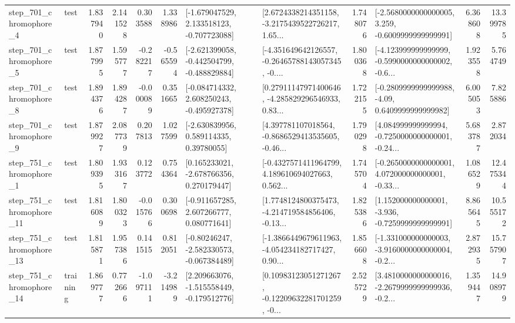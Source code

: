 \begin{tabular}{llrrrrllrlrr}
   step\_701\_chromophore\_4 &      test &      1.837940 &    2.141528 &      0.303588 &  1.338986 &   [-1.679047529, 2.133518123, -0.707723088] &  [2.6724338214351158, -3.2175439522726217, 1.65... &       1.748076 &  [-2.5680000000000005, 3.259, -0.6009999999999991] &            6.368608 &         13.399785 \\
   step\_701\_chromophore\_5 &      test &      1.877995 &    1.595777 &     -0.282217 & -0.565594 &  [-2.621399058, -0.442504799, -0.488829884] &  [-4.351649642126557, -0.26465788143057345, -0.... &       1.800368 &  [-4.123999999999999, -0.5990000000000002, -0.6... &            1.923558 &          5.764749 \\
   step\_701\_chromophore\_8 &      test &      1.894376 &    1.894287 &     -0.000089 &  0.351665 &   [-0.084714332, 2.608250243, -0.495927378] &  [0.27911147971400646, -4.285829296546933, 0.83... &       1.722155 &   [-0.2809999999999988, -4.09, 0.6409999999999982] &            6.005053 &          7.825886 \\
   step\_701\_chromophore\_9 &      test &      1.879927 &    2.087739 &      0.207813 &  1.027599 &     [-2.630839956, 0.589114335, 0.39780055] &  [4.397781107018564, -0.8686529413535605, -0.46... &       1.790298 &  [4.084999999999994, -0.7250000000000001, -0.24... &            5.683787 &          2.872034 \\
   step\_751\_chromophore\_1 &      test &      1.809395 &    1.933167 &      0.123772 &  0.754364 &    [0.165233021, -2.678766356, 0.270179447] &  [-0.4327571411964799, 4.189610694027663, 0.562... &       1.745704 &  [-0.2650000000000001, 4.072000000000001, -0.33... &            1.086529 &         12.475344 \\
  step\_751\_chromophore\_11 &      test &      1.816089 &    1.800323 &     -0.015766 &  0.300698 &    [-0.911657285, 2.607266777, 0.080771641] &  [1.7748124800375473, -4.214719584856406, -0.13... &       1.825386 &   [1.152000000000001, -3.936, -0.7259999999999991] &            8.865645 &         10.555172 \\
  step\_751\_chromophore\_13 &      test &      1.815871 &    1.957386 &      0.141515 &  0.812051 &   [-0.80246247, -2.582330573, -0.067384489] &  [-1.3866449679611963, -4.054234182717427, 0.90... &       1.856608 &  [-1.331000000000003, -3.9160000000000004, -0.2... &            2.872935 &         15.757907 \\
  step\_751\_chromophore\_14 &  training &      1.869777 &    0.772666 &     -1.097111 & -3.214989 &   [2.209663076, -1.515558449, -0.179512776] &  [0.10983123051271267, -0.12209632281701259, -0... &       2.525729 &  [3.4810000000000016, -2.2679999999999936, -0.2... &            1.359447 &         14.908979 \\

\end{tabular}
